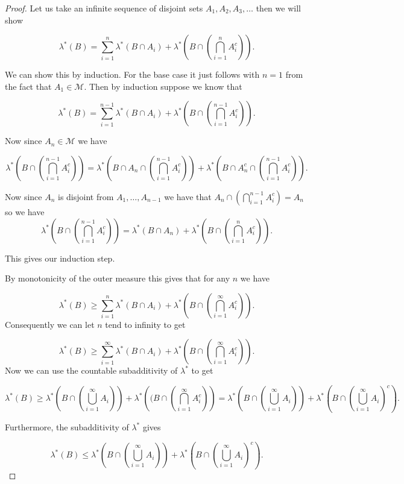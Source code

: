 \documentclass[
]{book}
\theoremstyle{definition}
\theoremstyle{definition}
\theoremstyle{definition}
\theoremstyle{definition}
\theoremstyle{remark}
\begin{document}
\begin{proof}
Let us take an infinite sequence of disjoint sets \(A_1, A_2, A_3, \dots\) then we will show

\[ \lambda^*(B) = \sum_{i=1}^n \lambda^* (B \cap A_i) + \lambda^*\left( B \cap \left( \bigcap_{i=1}^n A_i^c \right) \right). \]

We can show this by induction. For the base case it just follows with \(n=1\) from the fact that \(A_1 \in \mathscr{M}\). Then by induction suppose we know that

\[ \lambda^*(B) = \sum_{i=1}^{n-1} \lambda^*(B \cap A_i) + \lambda^*\left( B \cap \left( \bigcap_{i=1}^{n-1} A_i^c \right) \right).  \]

Now since \(A_n \in \mathscr{M}\) we have

\[ \lambda^*\left( B \cap \left( \bigcap_{i=1}^{n-1} A_i^c \right) \right) = \lambda^* \left(B \cap A_n \cap \left( \bigcap_{i=1}^{n-1} A_i^c \right)  \right) + \lambda^* \left( B \cap A_n^c \cap \left( \bigcap_{i=1}^{n-1} A_i^c \right) \right).\]

Now since \(A_n\) is disjoint from \(A_1, \dots, A_{n-1}\) we have that \(A_n \cap \left( \bigcap_{i=1}^{n-1} A_i^c \right) = A_n\) so we have
\[  \lambda^*\left( B \cap \left( \bigcap_{i=1}^{n-1} A_i^c \right) \right) = \lambda^*(B \cap A_n) + \lambda^*\left( B \cap \left( \bigcap_{i=1}^{n} A_i^c \right) \right). \]

This gives our induction step.

By monotonicity of the outer measure this gives that for any \(n\) we have

\[ \lambda^*(B) \geq \sum_{i=1}^n \lambda^*(B \cap A_i) + \lambda^* \left(B \cap \left( \bigcap_{i=1}^\infty A_i^c \right) \right). \]
Consequently we can let \(n\) tend to infinity to get

\[ \lambda^*(B) \geq \sum_{i=1}^\infty \lambda^*(B \cap A_i) +\lambda^* \left(B \cap \left( \bigcap_{i=1}^\infty A_i^c \right) \right). \]
Now we can use the countable subadditivity of \(\lambda^*\) to get

\[ \lambda^*(B) \geq \lambda^*\left( B \cap \left( \bigcup_{i=1}^\infty A_i \right)\right) + \lambda^*\left((B \cap \left( \bigcap_{i=1}^\infty A_i^c \right) \right) = \lambda^* \left( B \cap \left( \bigcup_{i=1}^\infty A_i \right) \right) + \lambda^* \left( B \cap \left( \bigcup_{i=1}^\infty A_i \right)^c \right).\]

Furthermore, the subadditivity of \(\lambda^*\) gives

\[ \lambda^*(B) \leq  \lambda^* \left( B \cap \left( \bigcup_{i=1}^\infty A_i \right) \right) + \lambda^* \left( B \cap \left( \bigcup_{i=1}^\infty A_i \right)^c \right). \]


\end{proof}
\end{document}

